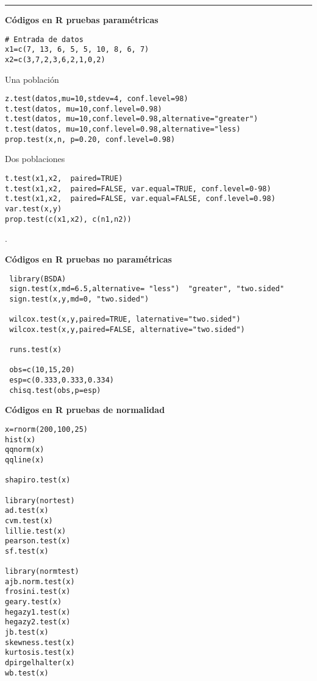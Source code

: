 \documentclass[base=hide,9pt]{elegantbook}
\begin{document}
\begin{multicols}{2}
{\begin{tabular}{lc}
	\end{tabular}
}

\rule{9cm}{1pt}

\vspace{.5cm}
\textcolor{col4}{\bf Códigos en R pruebas paramétricas }\\
{\scriptsize
\begin{verbatim}
# Entrada de datos 
x1=c(7, 13, 6, 5, 5, 10, 8, 6, 7)
x2=c(3,7,2,3,6,2,1,0,2)
\end{verbatim} 
Una población
\begin{verbatim}
z.test(datos,mu=10,stdev=4, conf.level=98)
t.test(datos, mu=10,conf.level=0.98)
t.test(datos, mu=10,conf.level=0.98,alternative="greater")
t.test(datos, mu=10,conf.level=0.98,alternative="less)
prop.test(x,n, p=0.20, conf.level=0.98)
\end{verbatim}%
Dos poblaciones \\
\begin{verbatim}
t.test(x1,x2,  paired=TRUE)
t.test(x1,x2,  paired=FALSE, var.equal=TRUE, conf.level=0-98)
t.test(x1,x2,  paired=FALSE, var.equal=FALSE, conf.level=0.98)
var.test(x,y)
prop.test(c(x1,x2), c(n1,n2))
\end{verbatim}
}

\end{multicols}
\newpage 

.\vspace{1cm}
\begin{multicols}{2} 
\textcolor{col4}{\bf Códigos en R pruebas no paramétricas }\\
{\scriptsize
\begin{verbatim}
 library(BSDA)
 sign.test(x,md=6.5,alternative= "less")  "greater", "two.sided"
 sign.test(x,y,md=0, "two.sided")
 
 wilcox.test(x,y,paired=TRUE, laternative="two.sided")
 wilcox.test(x,y,paired=FALSE, alternative="two.sided")
 
 runs.test(x)
 
 obs=c(10,15,20)
 esp=c(0.333,0.333,0.334)
 chisq.test(obs,p=esp)  
\end{verbatim}
}
\vspace{.5cm}

\textcolor{col4}{\bf Códigos en R pruebas de normalidad}\\
{\scriptsize
\begin{verbatim}
x=rnorm(200,100,25)
hist(x)
qqnorm(x)
qqline(x)	
	
shapiro.test(x)

library(nortest)
ad.test(x)
cvm.test(x)
lillie.test(x)
pearson.test(x)
sf.test(x)

library(normtest)
ajb.norm.test(x)
frosini.test(x)
geary.test(x)
hegazy1.test(x)
hegazy2.test(x)
jb.test(x)
skewness.test(x)
kurtosis.test(x)
dpirgelhalter(x)
wb.test(x)
\end{verbatim}
}


\end{multicols}
 
\end{document}
